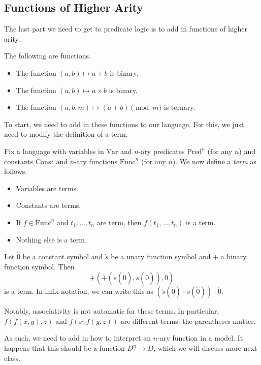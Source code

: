 \subsection{Functions of Higher Arity}
The last part we need to get to predicate logic is to add in functions of higher arity.
\begin{example}
	The following are functions.
	\begin{itemize}
		\item The function $(a,b)\mapsto a+b$ is binary.
		\item The function $(a,b)\mapsto a\times b$ is binary.
		\item The function $(a,b,m)\mapsto (a+b)\pmod m$ is ternary.
	\end{itemize}
\end{example}
To start, we need to add in these functions to our language. For this, we just need to modify the definition of a term.
\begin{definition}[Term]
	Fix a language with variables in $\mathrm{Var}$ and $n$-ary predicates $\mathrm{Pred}^n$ (for any $n$) and constants $\mathrm{Const}$ and $n$-ary functions $\mathrm{Func}^n$ (for any $n$). We now define a \textit{term} as follows.
	\begin{itemize}
		\item Variables are terms.
		\item Constants are terms.
		\item If $f\in\mathrm{Func}^n$ and $t_1,\ldots,t_n$ are term, then $f(t_1,\ldots,t_n)$ is a term.
		\item Nothing else is a term.
	\end{itemize}
\end{definition}
\begin{example}
	Let $\dot0$ be a constant symbol and $\dot s$ be a unary function symbol and $\dot+$ a binary function symbol. Then
	\[\dot+(\dot+(\dot s(\dot0),\dot s(\dot0)),\dot0)\]
	is a term. In infix notation, we can write this as $(\dot s(\dot0)\dot+\dot s(\dot0))\dot+\dot0$.
\end{example}
\begin{remark}
	Notably, associativity is not automatic for these terms. In particular, $f(f(x,y),z)$ and $f(x,f(y,z))$ are different terms: the parentheses matter.
\end{remark}
As such, we need to add in how to interpret an $n$-ary function in a model. It happens that this should be a function $D^n\to D$, which we will discuss more next class.